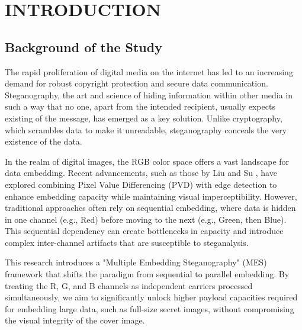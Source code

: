 \chapter{INTRODUCTION}

\section{Background of the Study}
The rapid proliferation of digital media on the internet has led to an increasing demand for robust copyright protection and secure data communication. Steganography, the art and science of hiding information within other media in such a way that no one, apart from the intended recipient, usually expects existing of the message, has emerged as a key solution. Unlike cryptography, which scrambles data to make it unreadable, steganography conceals the very existence of the data. 

In the realm of digital images, the RGB color space offers a vast landscape for data embedding. Recent advancements, such as those by Liu and Su \cite{liu2025color}, have explored combining Pixel Value Differencing (PVD) with edge detection to enhance embedding capacity while maintaining visual imperceptibility. However, traditional approaches often rely on sequential embedding, where data is hidden in one channel (e.g., Red) before moving to the next (e.g., Green, then Blue). This sequential dependency can create bottlenecks in capacity and introduce complex inter-channel artifacts that are susceptible to steganalysis.

This research introduces a "Multiple Embedding Steganography" (MES) framework that shifts the paradigm from sequential to parallel embedding. By treating the R, G, and B channels as independent carriers processed simultaneously, we aim to significantly unlock higher payload capacities required for embedding large data, such as full-size secret images, without compromising the visual integrity of the cover image.

